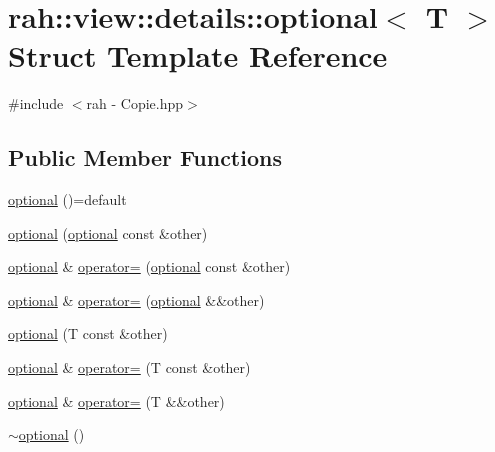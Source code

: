\hypertarget{structrah_1_1view_1_1details_1_1optional}{}\section{rah\+::view\+::details\+::optional$<$ T $>$ Struct Template Reference}
\label{structrah_1_1view_1_1details_1_1optional}


{\ttfamily \#include $<$rah -\/ Copie.\+hpp$>$}

\subsection*{Public Member Functions}
\begin{DoxyCompactItemize}
\item 
\mbox{\hyperlink{structrah_1_1view_1_1details_1_1optional_a70b8727b22b0d88c9cc823f818286c71}{optional}} ()=default
\item 
\mbox{\hyperlink{structrah_1_1view_1_1details_1_1optional_a8c15e1445849715fdef5bf9bfdf43a91}{optional}} (\mbox{\hyperlink{structrah_1_1view_1_1details_1_1optional}{optional}} const \&other)
\item 
\mbox{\hyperlink{structrah_1_1view_1_1details_1_1optional}{optional}} \& \mbox{\hyperlink{structrah_1_1view_1_1details_1_1optional_a0caa7da5df6580090a3ea0ea25887dfa}{operator=}} (\mbox{\hyperlink{structrah_1_1view_1_1details_1_1optional}{optional}} const \&other)
\item 
\mbox{\hyperlink{structrah_1_1view_1_1details_1_1optional}{optional}} \& \mbox{\hyperlink{structrah_1_1view_1_1details_1_1optional_abb6dd0692c4b2aa874b2a7db387e7c19}{operator=}} (\mbox{\hyperlink{structrah_1_1view_1_1details_1_1optional}{optional}} \&\&other)
\item 
\mbox{\hyperlink{structrah_1_1view_1_1details_1_1optional_a67103a826656faabd3a8d12fea4a6b33}{optional}} (T const \&other)
\item 
\mbox{\hyperlink{structrah_1_1view_1_1details_1_1optional}{optional}} \& \mbox{\hyperlink{structrah_1_1view_1_1details_1_1optional_a7e352c56530dfa8c330ac41dae64a270}{operator=}} (T const \&other)
\item 
\mbox{\hyperlink{structrah_1_1view_1_1details_1_1optional}{optional}} \& \mbox{\hyperlink{structrah_1_1view_1_1details_1_1optional_a0da71ff4ae436808c2de170250a988bb}{operator=}} (T \&\&other)
\item 
\mbox{\hyperlink{structrah_1_1view_1_1details_1_1optional_ad6f6daea081b390c0348f2907aabcc0b}{$\sim$optional}} ()

\end{DoxyCompactItemize}
